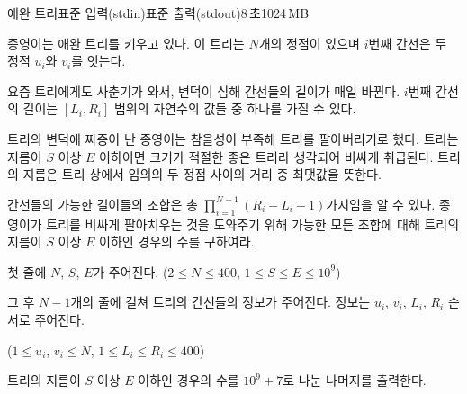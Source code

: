 \begin{problem}{애완 트리}{표준 입력(stdin)}{표준 출력(stdout)}{8\,초}{1024\,MB}

종영이는 애완 트리를 키우고 있다. 이 트리는 $N$개의 정점이 있으며 $i$번째 간선은 두 정점 $u_i$와 $v_i$를 잇는다.

요즘 트리에게도 사춘기가 와서, 변덕이 심해 간선들의 길이가 매일 바뀐다. $i$번째 간선의 길이는 $\left[L_i, R_i\right]$ 범위의 자연수의 값들 중 하나를 가질 수 있다.

트리의 변덕에 짜증이 난 종영이는 참을성이 부족해 트리를 팔아버리기로 했다. 트리는 지름이 $S$ 이상 $E$ 이하이면 크기가 적절한 좋은 트리라 생각되어 비싸게 취급된다. 트리의 지름은 트리 상에서 임의의 두 정점 사이의 거리 중 최댓값을 뜻한다.

간선들의 가능한 길이들의 조합은 총 $\prod_{i=1}^{N-1} \left(R_i-L_i+1\right)$가지임을 알 수 있다. 종영이가 트리를 비싸게 팔아치우는 것을 도와주기 위해 가능한 모든 조합에 대해 트리의 지름이 $S$ 이상 $E$ 이하인 경우의 수를 구하여라.

\InputFile
첫 줄에 $N$, $S$, $E$가 주어진다. ($2 \leq N \leq 400$, $1 \leq S \leq E \leq 10^9$)

그 후 $N-1$개의 줄에 걸쳐 트리의 간선들의 정보가 주어진다. 정보는 $u_i$, $v_i$, $L_i$, $R_i$ 순서로 주어진다.

($1 \leq u_i$, $v_i \leq N$, $1 \leq L_i \leq R_i \leq 400$)

\OutputFile
트리의 지름이 $S$ 이상 $E$ 이하인 경우의 수를 $10^9+7$로 나눈 나머지를 출력한다.

\Examples

\begin{example}
%
%
\end{example}

\end{problem}

